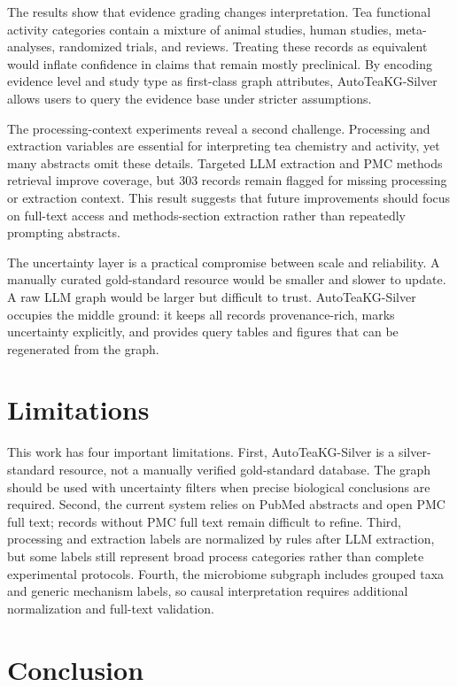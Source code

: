 \documentclass[11pt]{article}
\begin{document}
The results show that evidence grading changes interpretation. Tea functional activity categories contain a mixture of animal studies, human studies, meta-analyses, randomized trials, and reviews. Treating these records as equivalent would inflate confidence in claims that remain mostly preclinical. By encoding evidence level and study type as first-class graph attributes, AutoTeaKG-Silver allows users to query the evidence base under stricter assumptions.

The processing-context experiments reveal a second challenge. Processing and extraction variables are essential for interpreting tea chemistry and activity, yet many abstracts omit these details. Targeted LLM extraction and PMC methods retrieval improve coverage, but 303 records remain flagged for missing processing or extraction context. This result suggests that future improvements should focus on full-text access and methods-section extraction rather than repeatedly prompting abstracts.

The uncertainty layer is a practical compromise between scale and reliability. A manually curated gold-standard resource would be smaller and slower to update. A raw LLM graph would be larger but difficult to trust. AutoTeaKG-Silver occupies the middle ground: it keeps all records provenance-rich, marks uncertainty explicitly, and provides query tables and figures that can be regenerated from the graph.

\section{Limitations}

This work has four important limitations. First, AutoTeaKG-Silver is a silver-standard resource, not a manually verified gold-standard database. The graph should be used with uncertainty filters when precise biological conclusions are required. Second, the current system relies on PubMed abstracts and open PMC full text; records without PMC full text remain difficult to refine. Third, processing and extraction labels are normalized by rules after LLM extraction, but some labels still represent broad process categories rather than complete experimental protocols. Fourth, the microbiome subgraph includes grouped taxa and generic mechanism labels, so causal interpretation requires additional normalization and full-text validation.

\section{Conclusion}
\end{document}
